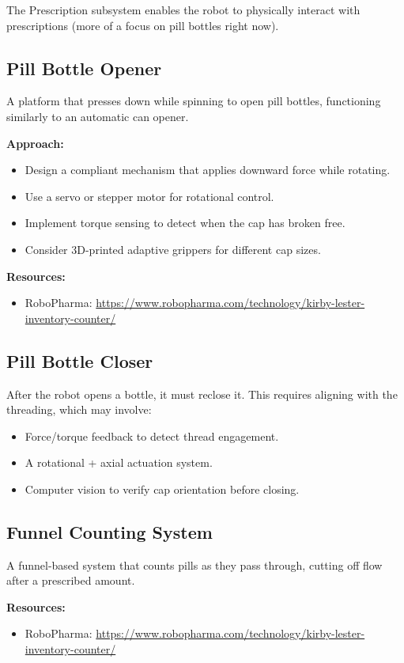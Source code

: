 \documentclass[11pt]{article}
\begin{document}
The Prescription subsystem enables the robot to physically interact with prescriptions (more of a focus on pill bottles right now).

\subsection{Pill Bottle Opener}
A platform that presses down while spinning to open pill bottles, functioning similarly to an automatic can opener.

\textbf{Approach:}
\begin{itemize}[nosep]
    \item Design a compliant mechanism that applies downward force while rotating.
    \item Use a servo or stepper motor for rotational control.
    \item Implement torque sensing to detect when the cap has broken free.
    \item Consider 3D-printed adaptive grippers for different cap sizes.
\end{itemize}

\textbf{Resources:}
\begin{itemize}[nosep]
    \item RoboPharma: \url{https://www.robopharma.com/technology/kirby-lester-inventory-counter/}
\end{itemize}

\subsection{Pill Bottle Closer}
After the robot opens a bottle, it must reclose it. This requires aligning with the threading, which may involve:
\begin{itemize}[nosep]
    \item Force/torque feedback to detect thread engagement.
    \item A rotational + axial actuation system.
    \item Computer vision to verify cap orientation before closing.
\end{itemize}

\subsection{Funnel Counting System}
A funnel-based system that counts pills as they pass through, cutting off flow after a prescribed amount.

\textbf{Resources:}
\begin{itemize}[nosep]
    \item RoboPharma: \url{https://www.robopharma.com/technology/kirby-lester-inventory-counter/}
\end{itemize}
\end{document}
